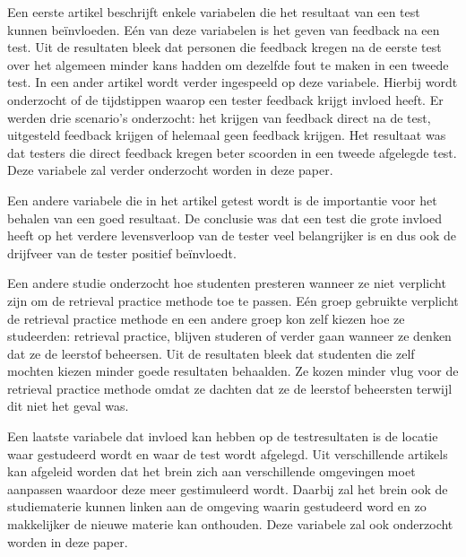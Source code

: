 \documentclass{hogent-article}
\begin{document}
    
    Een eerste artikel \autocite{brame2015test} beschrijft enkele variabelen die het resultaat van een test kunnen beïnvloeden. Eén van deze variabelen is het geven van feedback na een test. Uit de resultaten bleek dat personen die feedback kregen na de eerste test over het algemeen minder kans hadden om dezelfde fout te maken in een tweede test.
    In een ander artikel \autocite{roediger2011critical} wordt verder ingespeeld op deze variabele. Hierbij wordt onderzocht of de tijdstippen waarop een tester feedback krijgt invloed heeft. Er werden drie scenario's onderzocht: het krijgen van feedback direct na de test, uitgesteld feedback krijgen of helemaal geen feedback krijgen. Het resultaat was dat testers die direct feedback kregen beter scoorden in een tweede afgelegde test. Deze variabele zal verder onderzocht worden in deze paper.
    
    Een andere variabele die in het artikel \autocite{brame2015test} getest wordt is de importantie voor het behalen van een goed resultaat. De conclusie was dat een test die grote invloed heeft op het verdere levensverloop van de tester veel belangrijker is en dus ook de drijfveer van de tester positief beïnvloedt.
    
    Een andere studie \autocite{karpicke2009metacognitive} onderzocht hoe studenten presteren wanneer ze niet verplicht zijn om de retrieval practice methode toe te passen. Eén groep gebruikte verplicht de retrieval practice methode en een andere groep kon zelf kiezen hoe ze studeerden: retrieval practice, blijven studeren of verder gaan wanneer ze denken dat ze de leerstof beheersen. Uit de resultaten bleek dat studenten die zelf mochten kiezen minder goede resultaten behaalden. Ze kozen minder vlug voor de retrieval practice methode omdat ze dachten dat ze de leerstof beheersten terwijl dit niet het geval was. 
    
    
    Een laatste variabele dat invloed kan hebben op de testresultaten is de locatie waar gestudeerd wordt en waar de test wordt afgelegd. Uit verschillende artikels \autocite{smith1978environmental, smith1984contextual} kan afgeleid worden dat het brein zich aan verschillende omgevingen moet aanpassen waardoor deze meer gestimuleerd wordt. Daarbij zal het brein ook de studiematerie kunnen linken aan de omgeving waarin gestudeerd word en zo makkelijker de nieuwe materie kan onthouden. Deze variabele zal ook onderzocht worden in deze paper.
      
\end{document}
